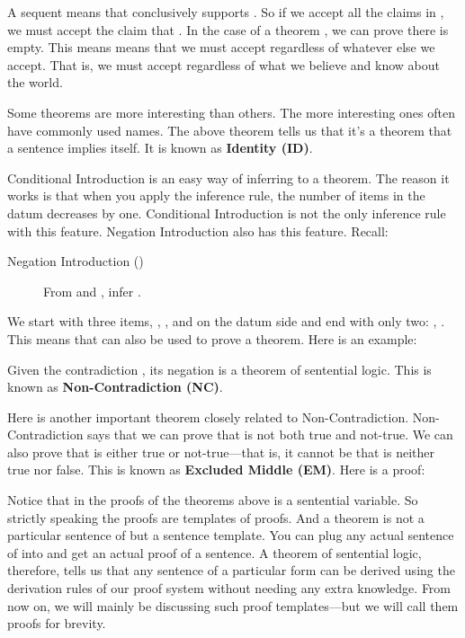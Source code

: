 A sequent  means that \p{\Gamma} conclusively supports . So if we accept all the 
claims in \p{\Gamma}, we must accept the claim that . In the case of a 
theorem , we can prove  there \p{\Gamma} is empty. This 
means means that we must accept  regardless of whatever else we accept.  
That is, we must accept  regardless of what we believe and know about the 
world. 

Some theorems are more interesting than others.  The more interesting ones often 
have commonly used names. The above theorem tells us that it's a theorem that a 
sentence implies itself. It is known as \textbf{Identity (ID)}.



Conditional Introduction is an easy way of inferring to a theorem. The reason it 
works is that when you apply the inference rule, the number of items in the 
datum decreases by one. Conditional Introduction is not the only inference rule 
with this feature. Negation Introduction also has this feature. Recall:

\begin{description}
 \item[Negation Introduction (\negI)] From  and , infer .
\end{description}

We start with three items, \p{\Gamma}, \p{\Delta}, and  on the datum side 
and end with only two: \p{\Gamma}, \p{\Delta}. This means that \p{\negI} can 
also be used to prove a theorem. Here is an example:



Given the contradiction , its negation is a theorem of 
sentential logic.  This is known as \textbf{Non-Contradiction (NC)}.

Here is another important theorem closely related to Non-Contradiction. 
Non-Contradiction says that we can prove that  is not both true and 
not-true. We can also prove that  is either true or not-true---that is, it 
cannot be that  is neither true nor false.  This is known as 
\textbf{Excluded Middle (EM)}. Here is a proof:
\newpage




Notice that  in the  proofs of the theorems above is a sentential variable.  
So strictly speaking the proofs are templates of proofs. And a theorem is not a 
particular sentence of \lL{} but a sentence template.  You can plug any actual 
sentence of \lL{} into  and get an actual proof of a sentence. A theorem of 
sentential logic, therefore, tells us that any sentence of a particular form can 
be derived using the derivation rules of our proof system without needing any 
extra knowledge. From now on, we will mainly be discussing such proof 
templates---but we will call them proofs for brevity.


